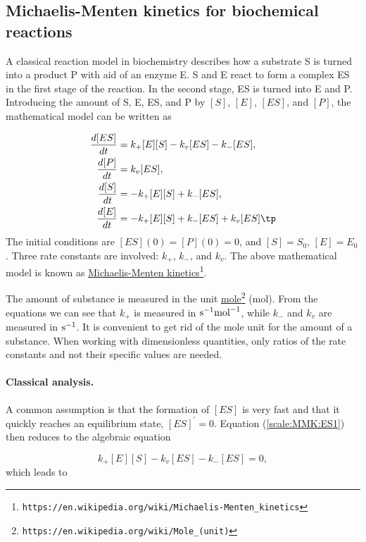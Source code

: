 \documentclass[graybox,envcountchap,sectrefs,final]{svmonodo}
\begin{document}
\subsection{Michaelis-Menten kinetics for biochemical reactions}
\label{scale:MMK}

A classical reaction model in biochemistry describes how a
substrate S is turned into a product P with aid of an enzyme E.
S and E react to form a complex ES in the first stage of the reaction.
In the second stage, ES is turned into E and P.
Introducing the amount of S, E, ES, and P by $[S]$, $[E]$, $[ES]$, and
$[P]$, the mathematical model can be written as

\begin{align}
\frac{d[ES]}{dt} &= k_+[E][S] - k_v[ES] - k_-[ES],
\label{scale:MMK:ES1}\\ 
\frac{d[P]}{dt} &= k_v[ES],
\label{scale:MMK:P1}\\ 
\frac{d[S]}{dt} &= -k_+[E][S] + k_-[ES],
\label{scale:MMK:S1}\\ 
\frac{d[E]}{dt} &= -k_+[E][S] + k_-[ES] + k_v[ES]\tp
\label{scale:MMK:E1}
\end{align}
The initial conditions are $[ES](0)=[P](0)=0$, and $[S]=S_0$, $[E]=E_0$.
Three rate constants are involved: $k_+$, $k_-$, and $k_v$.
The above mathematical model is known as \href{{https://en.wikipedia.org/wiki/Michaelis-Menten_kinetics}}{Michaelis-Menten kinetics}\footnote{\texttt{https://en.wikipedia.org/wiki/Michaelis-Menten\_kinetics}}.

The amount of substance is measured in the unit \href{{https://en.wikipedia.org/wiki/Mole_(unit)}}{mole}\footnote{\texttt{https://en.wikipedia.org/wiki/Mole\_(unit)}} (mol). From the equations we can see that
$k_+$ is measured in $\hbox{s}^{-1}\hbox{mol}^{-1}$, while $k_-$ and
$k_v$ are measured in $\hbox{s}^{-1}$. It is convenient to get rid of
the mole unit for the amount of a substance. When working with
dimensionless quantities, only ratios of the rate constants and not their
specific values are needed.

\paragraph{Classical analysis.}
A common assumption is that the formation of $[ES]$ is very fast and that
it quickly reaches an equilibrium state, $[ES]^{\prime}=0$. Equation
(\ref{scale:MMK:ES1}) then reduces to the algebraic equation

\[ k_+[E][S] - k_v[ES] - k_-[ES] = 0, \]
which leads to
\end{document}
